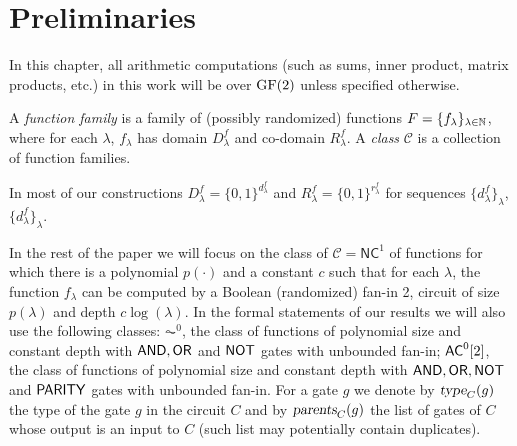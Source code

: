 \section{Preliminaries}
\label{sec:prelim}




In this chapter, all arithmetic computations (such as sums, inner product, matrix products, etc.) in this work will be over $\text{GF}(2)$ unless specified otherwise.

\begin{definition}
A {\em function family} is a family of (possibly randomized) functions $F = \{f_{\lambda}\}_{\lambda\in\mathbb{N}}$, where for each $\lambda$, $f_{\lambda}$ has domain $D^f_{\lambda}$ and co-domain $R^f_{\lambda}$. A {\em class} $\mathcal{C}$ 
is a collection of function families. 
\end{definition}
In most of our constructions $D^f_{\lambda}=\{0,1\}^{d_\lambda^f}$ and $R^f_{\lambda}=\{0,1\}^{r_\lambda^f}$ for sequences $\{d_\lambda^f\}_\lambda$, 
$\{d_\lambda^f\}_\lambda$. 

In the rest of the paper we will focus on the class of $\mathcal{C}=\mathsf{NC}^1$ of functions for which there is a polynomial $p(\cdot)$ and a constant $c$ such that for each $\lambda$, the function $f_\lambda$ can be computed by a Boolean (randomized) fan-in 2, circuit of size $p(\lambda)$ and depth $c \log(\lambda)$. In the formal statements of our results we will also use the following classes: $\AC^0$, the class of functions of polynomial size and constant depth with $\mathsf{AND}, \mathsf{OR}$ and $\mathsf{NOT}$ gates with unbounded fan-in; ${\mathsf{AC}}^0[2]$, the class of functions of polynomial size and constant depth with $\mathsf{AND}, \mathsf{OR}, \mathsf{NOT}$ and $\mathsf{PARITY}$ gates with unbounded fan-in. For a gate $g$ we denote by ${\textsl{type}}_C(g)$ the type of the gate $g$ in the circuit $C$ and by ${\textsl{parents}}_C(g)$ the list of gates of $C$ whose output is an input to $C$ (such list may potentially contain duplicates). 

